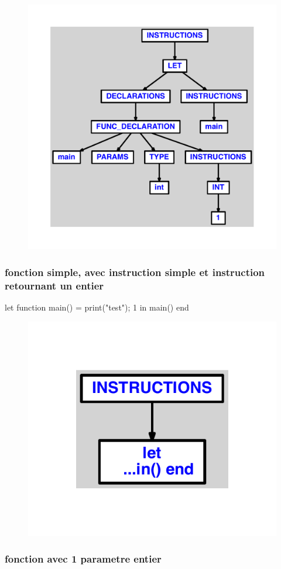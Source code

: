 \documentclass{article}
\begin{document}
\begin{figure}[H]\centering\includegraphics[max width=\textwidth]{ast/ast_222.pdf}\end{figure}\subsubsection{fonction simple, avec instruction simple et instruction retournant un entier}
\begin{verbatimtab}
let
	function main() =
		print("test");
		1
in main() end
\end{verbatimtab}
\begin{figure}[H]\centering\includegraphics[max width=\textwidth]{ast/ast_223.pdf}\end{figure}\subsubsection{fonction avec 1 parametre entier}
\end{document}
